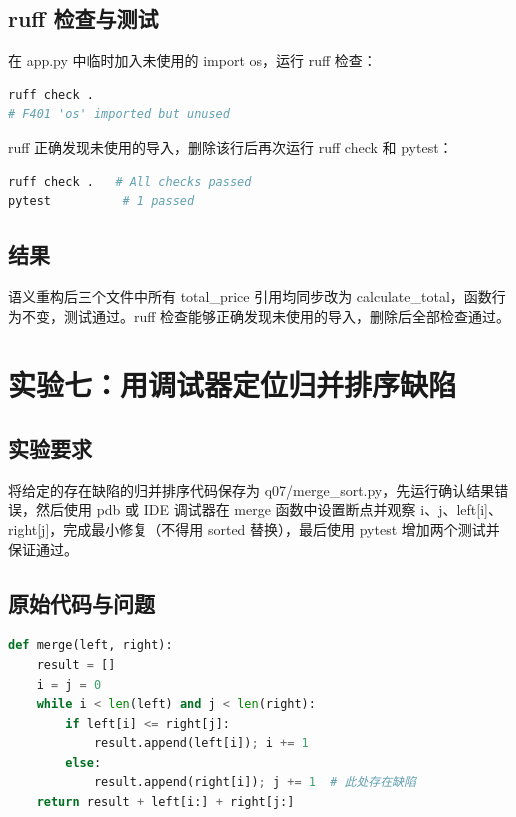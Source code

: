\documentclass[UTF8]{ctexart}
\begin{document}
\subsection{ruff 检查与测试}

在 app.py 中临时加入未使用的 import os，运行 ruff 检查：

\begin{lstlisting}[language=bash]
ruff check .
# F401 'os' imported but unused
\end{lstlisting}

ruff 正确发现未使用的导入，删除该行后再次运行 ruff check 和 pytest：

\begin{lstlisting}[language=bash]
ruff check .   # All checks passed
pytest          # 1 passed
\end{lstlisting}

\subsection{结果}

语义重构后三个文件中所有 total\_price 引用均同步改为 calculate\_total，函数行为不变，测试通过。ruff 检查能够正确发现未使用的导入，删除后全部检查通过。

\section{实验七：用调试器定位归并排序缺陷}

\subsection{实验要求}

将给定的存在缺陷的归并排序代码保存为 q07/merge\_sort.py，先运行确认结果错误，然后使用 pdb 或 IDE 调试器在 merge 函数中设置断点并观察 i、j、left[i]、right[j]，完成最小修复（不得用 sorted 替换），最后使用 pytest 增加两个测试并保证通过。

\subsection{原始代码与问题}

\begin{lstlisting}[language=Python]
def merge(left, right):
    result = []
    i = j = 0
    while i < len(left) and j < len(right):
        if left[i] <= right[j]:
            result.append(left[i]); i += 1
        else:
            result.append(right[i]); j += 1  # 此处存在缺陷
    return result + left[i:] + right[j:]
\end{lstlisting}
\end{document}
